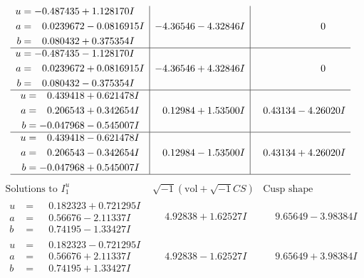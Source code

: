 \documentclass[1p]{elsarticle_modified}
\theoremstyle{definition}
\newcommand{\I}{\sqrt{-1}}
\begin{document}
$$\begin{array}{c|c|c}
\begin{aligned}
u &= -0.487435 + 1.128170 I \\
a &= \phantom{-}0.0239672 - 0.0816915 I \\
b &= \phantom{-}0.080432 + 0.375354 I\end{aligned}
 & -4.36546 - 4.32846 I & \phantom{-0.000000 } 0 \\ \hline\begin{aligned}
u &= -0.487435 - 1.128170 I \\
a &= \phantom{-}0.0239672 + 0.0816915 I \\
b &= \phantom{-}0.080432 - 0.375354 I\end{aligned}
 & -4.36546 + 4.32846 I & \phantom{-0.000000 } 0 \\ \hline\begin{aligned}
u &= \phantom{-}0.439418 + 0.621478 I \\
a &= \phantom{-}0.206543 + 0.342654 I \\
b &= -0.047968 - 0.545007 I\end{aligned}
 & \phantom{-}0.12984 + 1.53500 I & \phantom{-}0.43134 - 4.26020 I \\ \hline\begin{aligned}
u &= \phantom{-}0.439418 - 0.621478 I \\
a &= \phantom{-}0.206543 - 0.342654 I \\
b &= -0.047968 + 0.545007 I\end{aligned}
 & \phantom{-}0.12984 - 1.53500 I & \phantom{-}0.43134 + 4.26020 I\\
 \hline 
 \end{array}$$\newpage$$\begin{array}{c|c|c}  
\text{Solutions to }I^u_{1}& \I (\text{vol} + \sqrt{-1}CS) & \text{Cusp shape}\\
 \hline 
\begin{aligned}
u &= \phantom{-}0.182323 + 0.721295 I \\
a &= \phantom{-}0.56676 - 2.11337 I \\
b &= \phantom{-}0.74195 - 1.33427 I\end{aligned}
 & \phantom{-}4.92838 + 1.62527 I & \phantom{-}9.65649 - 3.98384 I \\ \hline\begin{aligned}
u &= \phantom{-}0.182323 - 0.721295 I \\
a &= \phantom{-}0.56676 + 2.11337 I \\
b &= \phantom{-}0.74195 + 1.33427 I\end{aligned}
 & \phantom{-}4.92838 - 1.62527 I & \phantom{-}9.65649 + 3.98384 I \\ \hline\begin{aligned}

\end{aligned}
\end{array}$$
\end{document}
